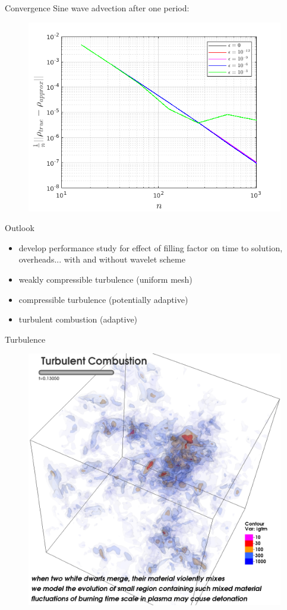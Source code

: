 \documentclass{beamer}
\begin{document}
\begin{frame}{Convergence}
  Sine wave advection after one period:
  \begin{figure}
    \center
    \includegraphics[scale=0.5]{convergence.png}
  \end{figure}
\end{frame}

\begin{frame}{Outlook}
  \begin{itemize}
    \item develop performance study for effect of filling factor on time to
          solution, overheads... with and without wavelet scheme
    \item weakly compressible turbulence (uniform mesh)
    \item compressible turbulence (potentially adaptive)
    \item turbulent combustion (adaptive)
  \end{itemize}
\end{frame}
  
\begin{frame}{Turbulence}
  \begin{figure}
    \center
    \includegraphics[scale=0.15]{tburn1.png}
  \end{figure}
\end{frame}
\end{document}
